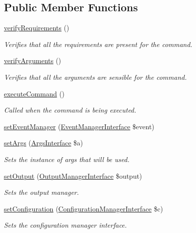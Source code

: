 \subsection*{Public Member Functions}
\begin{DoxyCompactItemize}
\item 
\hyperlink{classSiteBuildCommand_a28937f6520fae61f4e49be11f990a215}{verify\-Requirements} ()
\begin{DoxyCompactList}\small\item\em Verifies that all the requirements are present for the command. \end{DoxyCompactList}\item 
\hyperlink{classSiteBuildCommand_abb995731e7f6e81316c7557409311f18}{verify\-Arguments} ()
\begin{DoxyCompactList}\small\item\em Verifies that all the arguments are sensible for the command. \end{DoxyCompactList}\item 
\hyperlink{classSiteBuildCommand_a5bc9cc514c654c6c8bf276b744eae537}{execute\-Command} ()
\begin{DoxyCompactList}\small\item\em Called when the command is being executed. \end{DoxyCompactList}\item 
\hyperlink{classGenericCommand_acba0758cce439b8aeaff359578ba5d1d}{set\-Event\-Manager} (\hyperlink{interfaceEventManagerInterface}{Event\-Manager\-Interface} \$event)
\item 
\hyperlink{classGenericCommand_ab918b084bc099cb5f8f56db2d6ed4cac}{set\-Args} (\hyperlink{interfaceArgsInterface}{Args\-Interface} \$a)
\begin{DoxyCompactList}\small\item\em Sets the instance of args that will be used. \end{DoxyCompactList}\item 
\hyperlink{classGenericCommand_aee43238a646b83c341ccb27b7d8e0978}{set\-Output} (\hyperlink{interfaceOutputManagerInterface}{Output\-Manager\-Interface} \$output)
\begin{DoxyCompactList}\small\item\em Sets the output manager. \end{DoxyCompactList}\item 
\hyperlink{classGenericCommand_a3677ddac20e11f61766c56820f74555b}{set\-Configuration} (\hyperlink{interfaceConfigurationManagerInterface}{Configuration\-Manager\-Interface} \$c)
\begin{DoxyCompactList}\small\item\em Sets the configuration manager interface. \end{DoxyCompactList}\end{DoxyCompactItemize}
